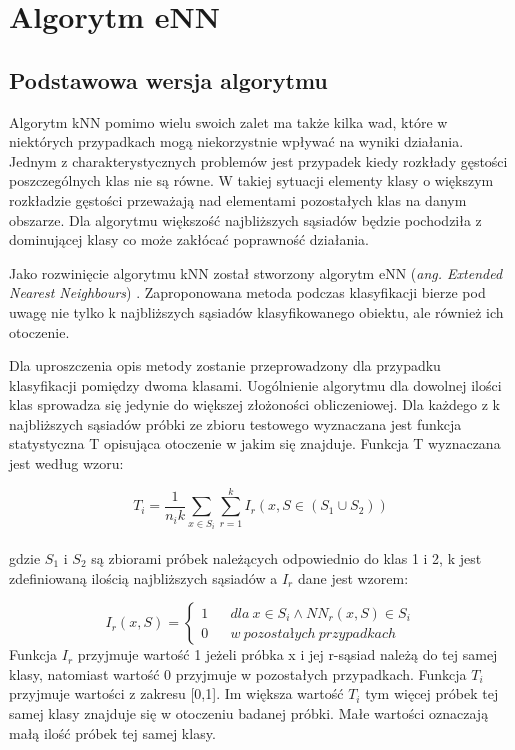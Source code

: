 \chapter{Algorytm eNN}
\label{chap:enn}
\section{Podstawowa wersja algorytmu}
Algorytm kNN pomimo wielu swoich zalet ma także kilka wad, które w niektórych przypadkach mogą niekorzystnie wpływać na wyniki działania. Jednym z charakterystycznych problemów jest przypadek kiedy rozkłady gęstości poszczególnych klas nie są równe. W takiej sytuacji elementy klasy o większym rozkładzie gęstości przeważają nad elementami pozostałych klas na danym obszarze. Dla algorytmu większość najbliższych sąsiadów będzie pochodziła z dominującej klasy co może zakłócać poprawność działania.

Jako rozwinięcie algorytmu kNN został stworzony algorytm eNN (\textit{ang. Extended Nearest Neighbours}) \cite{haibo-he}. Zaproponowana metoda podczas klasyfikacji bierze pod uwagę nie tylko k najbliższych sąsiadów klasyfikowanego obiektu, ale również ich otoczenie. 

Dla uproszczenia opis metody zostanie przeprowadzony dla przypadku klasyfikacji pomiędzy dwoma klasami. Uogólnienie algorytmu dla dowolnej ilości klas sprowadza się jedynie do większej złożoności obliczeniowej. Dla każdego z k najbliższych sąsiadów próbki ze zbioru testowego wyznaczana jest funkcja statystyczna T opisująca otoczenie w jakim się znajduje. Funkcja T wyznaczana jest według wzoru:

\begin{equation}
T_{i} = \frac{1}{n_i k} {\sum_{x \in S_i} \sum_{r=1}^{k} I_r (x,S \in (S_1 \cup S_2))} 
\end{equation}\\
gdzie $S_1$ i $S_2$ są zbiorami próbek należących odpowiednio do klas 1 i 2, k jest zdefiniowaną ilością najbliższych sąsiadów a $I_r$ dane jest wzorem:

\begin{equation}
I_r(x,S) =\left\{\begin{matrix}
1 &&	dla\ x \in S_i \wedge NN_{r}(x,S) \in S_i
\\
0 &&	w\ pozostałych\ przypadkach
\end{matrix}\right.
\end{equation}
Funkcja $I_r$ przyjmuje wartość 1 jeżeli próbka x i jej r-sąsiad należą do tej samej klasy, natomiast wartość 0 przyjmuje w pozostałych przypadkach.
Funkcja $T_i$ przyjmuje wartości z zakresu [0,1]. Im większa wartość $T_i$ tym więcej próbek tej samej klasy znajduje się w otoczeniu badanej próbki. Małe wartości oznaczają małą ilość próbek tej samej klasy.

